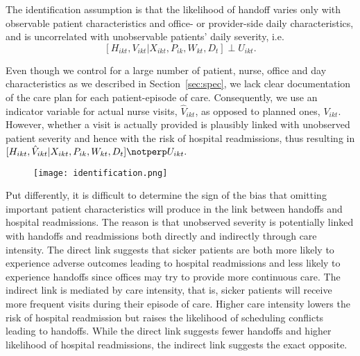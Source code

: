 \documentclass[final,12pt, notitlepage]{article}
\begin{document}
The identification assumption is that the likelihood of handoff varies only with observable patient characteristics and office- or provider-side daily characteristics, and is uncorrelated with unobservable patients' daily severity, i.e.
$$[H_{ikt}, V_{ikt} | X_{ikt}, P_{ik}, W_{kt}, D_t] \perp U_{ikt}.$$

Even though we control for a large number of patient, nurse, office and day characteristics as we described in Section~\ref{sec:spec}, we lack clear documentation of the care plan for each patient-episode of care. Consequently, we use an indicator variable for actual nurse visits, $\hat{V}_{ikt}$, as opposed to planned ones, $V_{ikt}$. However, whether a visit is actually provided is plausibly linked with unobserved patient severity and hence with the risk of hospital readmissions, thus resulting in $[H_{ikt}, \hat{V}_{ikt} | X_{ikt}, P_{ik}, W_{kt}, D_t] \notperp U_{ikt}.$


\graphicspath{ {/Users/kimk13/Dropbox/Wharton/Research/Labor/gph/anhandoff/} }
\begin{figure}[H]
\centering
\texttt{[image: identification.png]}
\footnotesize
\label{fig:identification}
\end{figure}
Put differently, it is difficult to determine the sign of the bias that omitting important patient characteristics will produce in the link between handoffs and hospital readmissions. The reason is that unobserved severity is potentially linked with handoffs and readmissions both directly and indirectly through care intensity. The direct link suggests that sicker patients are both more likely to experience adverse outcomes leading to hospital readmissions and less likely to experience handoffs since offices may try to provide more continuous care.
The indirect link is mediated by care intensity, that is, sicker patients will receive more frequent visits during their episode of care. Higher care intensity lowers the risk of hospital readmission but raises the likelihood of scheduling conflicts leading to handoffs. While the direct link suggests fewer handoffs and higher likelihood of hospital readmissions, the indirect link suggests the exact opposite.
\end{document}
